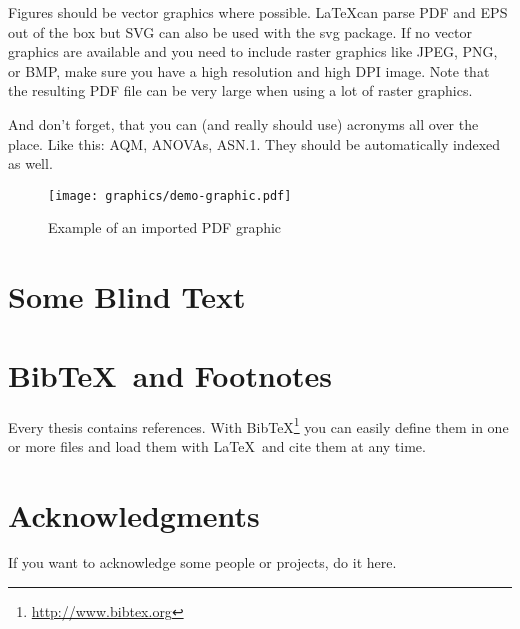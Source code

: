 \documentclass[masterthesis, english]{mas-thesis-chapters} %
\begin{document}
Figures should be vector graphics where possible. \LaTeX can parse PDF and EPS out of the box but SVG can also be used with the svg package. If no vector graphics are available and you need to include raster graphics like JPEG, PNG, or BMP, make sure you have a high resolution and high DPI image. Note that the resulting PDF file can be very large when using a lot of raster graphics.

And don't forget, that you can (and really should use) acronyms all over the place. Like this: \gls{AQM}, \glspl{ANOVA}, \acrshort{ASN.1}. They should be automatically indexed as well.

\begin{figure}[ht]
	\centering
	\texttt{[image: graphics/demo-graphic.pdf]}
	\caption{Example of an imported PDF graphic}
	\label{figure:1}
\end{figure}


\chapter{Some Blind Text}

\Blindtext



\chapter{Bib\TeX\ and Footnotes}

Every thesis contains references. With Bib\TeX\footnote{\url{http://www.bibtex.org}} you can easily define them in one or more files and load them with \LaTeX\ and cite them at any time.\cite{exampleBook}



\chapter*{Acknowledgments}

If you want to acknowledge some people or projects, do it here.



\cleardoublepage
\affidavit


\printbibliography[heading=bibintoc]
\end{document}
